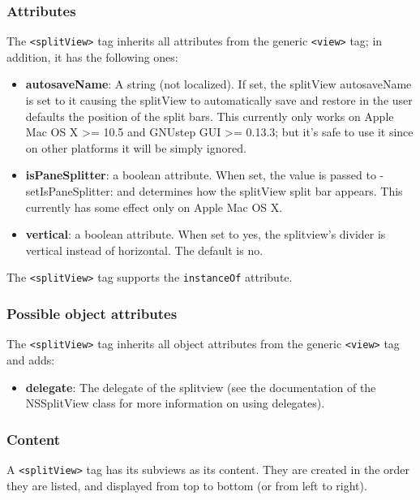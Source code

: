\subsubsection{Attributes}
The \texttt{<splitView>} tag inherits all attributes from the generic
\texttt{<view>} tag; in addition, it has the following ones:
\begin{itemize}
\item {\bf autosaveName}: A string (not localized).  If set, the
  splitView autosaveName is set to it causing the splitView to
  automatically save and restore in the user defaults the position of
  the split bars.  This currently only works on Apple Mac OS X >= 10.5
  and GNUstep GUI >= 0.13.3; but it's safe to use it since on other
  platforms it will be simply ignored.
\item {\bf isPaneSplitter}: a boolean attribute.  When set, the value
  is passed to -setIsPaneSplitter: and determines how the splitView
  split bar appears.  This currently has some effect only on Apple Mac
  OS X.
\item {\bf vertical}: a boolean attribute.  When set to yes, the
  splitview's divider is vertical instead of horizontal.  The default
  is no.
\end{itemize}
The \texttt{<splitView>} tag supports the \texttt{instanceOf} attribute.

\subsubsection{Possible object attributes}
The \texttt{<splitView>} tag inherits all object attributes from the
generic \texttt{<view>} tag and adds:
\begin{itemize}
\item {\bf delegate}: The delegate of the splitview (see the
  documentation of the NSSplitView class for more information on using
  delegates).
\end{itemize}

\subsubsection{Content}
A \texttt{<splitView>} tag has its subviews as its content.  They are
created in the order they are listed, and displayed from top to bottom
(or from left to right).

